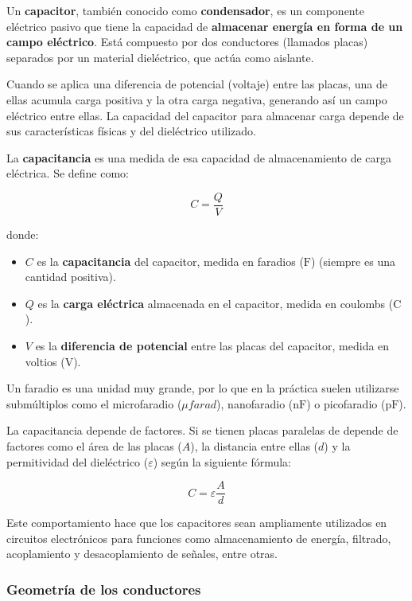 Un \textbf{capacitor}, también conocido como \textbf{condensador}, es un componente eléctrico pasivo que tiene la capacidad de \textbf{almacenar energía en forma de un campo eléctrico}. Está compuesto por dos conductores (llamados placas) separados por un material dieléctrico, que actúa como aislante.

Cuando se aplica una diferencia de potencial (voltaje) entre las placas, una de ellas acumula carga positiva y la otra carga negativa, generando así un campo eléctrico entre ellas. La capacidad del capacitor para almacenar carga depende de sus características físicas y del dieléctrico utilizado.

La \textbf{capacitancia} es una medida de esa capacidad de almacenamiento de carga eléctrica. Se define como:

\begin{equation}
    C = \frac{Q}{V}
    \label{eq:capacitance}    
\end{equation}

donde:

\begin{itemize}
    \item \( C \) es la \textbf{capacitancia} del capacitor, medida en faradios (\(\si{\farad}\)) (siempre es una cantidad positiva).
    \item \( Q \) es la \textbf{carga eléctrica} almacenada en el capacitor, medida en coulombs (\(\si{\coulomb}\)).
    \item \( V \) es la \textbf{diferencia de potencial} entre las placas del capacitor, medida en voltios (\(\si{\volt}\)).
\end{itemize}

Un faradio es una unidad muy grande, por lo que en la práctica suelen utilizarse submúltiplos como el microfaradio (\(\mu\si{farad}\)), nanofaradio (n\(\si{\farad}\)) o picofaradio (p\(\si{\farad}\)).

La capacitancia depende de factores. Si se tienen placas paralelas de depende de factores como el área de las placas (\(A\)), la distancia entre ellas (\(d\)) y la permitividad del dieléctrico (\( \varepsilon \)) según la siguiente fórmula:

\[
C = \varepsilon \frac{A}{d}
\]

Este comportamiento hace que los capacitores sean ampliamente utilizados en circuitos electrónicos para funciones como almacenamiento de energía, filtrado, acoplamiento y desacoplamiento de señales, entre otras.

\subsubsection{Geometría de los conductores}

